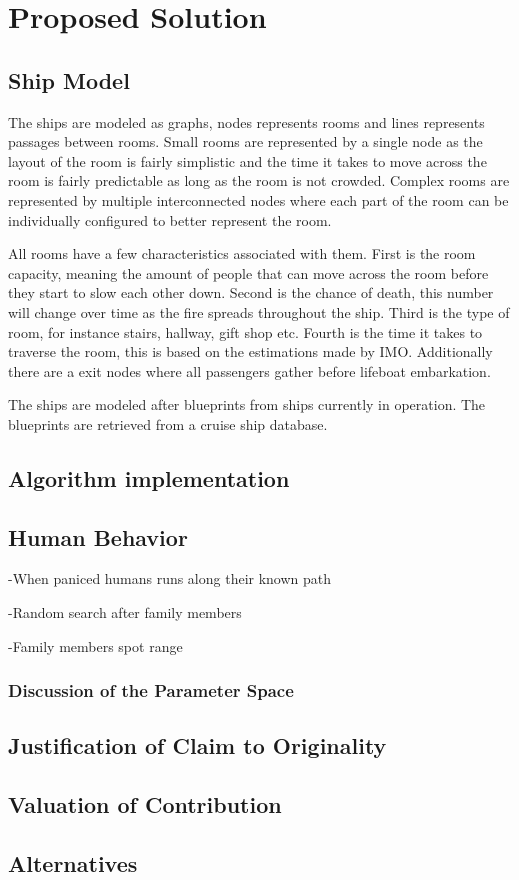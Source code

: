 \chapter{Proposed Solution}
\label{ch:solution}



\section{Ship Model}
The ships are modeled as graphs, nodes represents rooms and lines represents passages between rooms. Small rooms are represented by a single node as the layout of the room is fairly simplistic and the time it takes to move across the room is fairly predictable as long as the room is not crowded. Complex rooms are represented by multiple interconnected nodes where each part of the room can be individually configured to better represent the room. 

All rooms have a few characteristics associated with them. First is the room capacity, meaning the amount of people that can move across the room before they start to slow each other down. Second is the chance of death, this number will change over time as the fire spreads throughout the ship. Third is the type of room, for instance stairs, hallway, gift shop etc. Fourth is the time it takes to traverse the room, this is based on the estimations made by IMO. Additionally there are a exit nodes where all passengers gather before lifeboat embarkation.

The ships are modeled after blueprints from ships currently in operation. The blueprints are retrieved from a cruise ship database.  


\section{Algorithm implementation}



\section{Human Behavior}

-When paniced humans runs along their known path

-Random search after family members

-Family members spot range

\subsection{Discussion of the Parameter Space}

\section{Justification of Claim to Originality}

\section{Valuation of Contribution}

\section{Alternatives}
